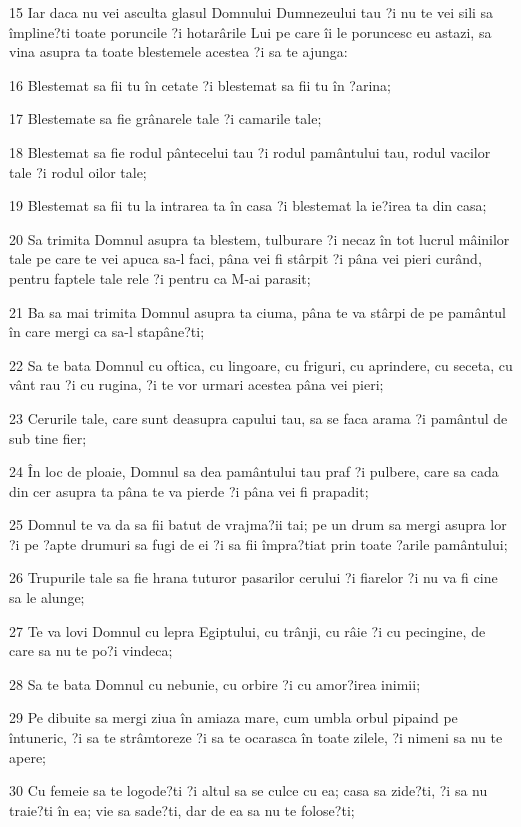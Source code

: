 \par 15 Iar daca nu vei asculta glasul Domnului Dumnezeului tau ?i nu te vei sili sa împline?ti toate poruncile ?i hotarârile Lui pe care îi le poruncesc eu astazi, sa vina asupra ta toate blestemele acestea ?i sa te ajunga:
\par 16 Blestemat sa fii tu în cetate ?i blestemat sa fii tu în ?arina;
\par 17 Blestemate sa fie grânarele tale ?i camarile tale;
\par 18 Blestemat sa fie rodul pântecelui tau ?i rodul pamântului tau, rodul vacilor tale ?i rodul oilor tale;
\par 19 Blestemat sa fii tu la intrarea ta în casa ?i blestemat la ie?irea ta din casa;
\par 20 Sa trimita Domnul asupra ta blestem, tulburare ?i necaz în tot lucrul mâinilor tale pe care te vei apuca sa-l faci, pâna vei fi stârpit ?i pâna vei pieri curând, pentru faptele tale rele ?i pentru ca M-ai parasit;
\par 21 Ba sa mai trimita Domnul asupra ta ciuma, pâna te va stârpi de pe pamântul în care mergi ca sa-l stapâne?ti;
\par 22 Sa te bata Domnul cu oftica, cu lingoare, cu friguri, cu aprindere, cu seceta, cu vânt rau ?i cu rugina, ?i te vor urmari acestea pâna vei pieri;
\par 23 Cerurile tale, care sunt deasupra capului tau, sa se faca arama ?i pamântul de sub tine fier;
\par 24 În loc de ploaie, Domnul sa dea pamântului tau praf ?i pulbere, care sa cada din cer asupra ta pâna te va pierde ?i pâna vei fi prapadit;
\par 25 Domnul te va da sa fii batut de vrajma?ii tai; pe un drum sa mergi asupra lor ?i pe ?apte drumuri sa fugi de ei ?i sa fii împra?tiat prin toate ?arile pamântului;
\par 26 Trupurile tale sa fie hrana tuturor pasarilor cerului ?i fiarelor ?i nu va fi cine sa le alunge;
\par 27 Te va lovi Domnul cu lepra Egiptului, cu trânji, cu râie ?i cu pecingine, de care sa nu te po?i vindeca;
\par 28 Sa te bata Domnul cu nebunie, cu orbire ?i cu amor?irea inimii;
\par 29 Pe dibuite sa mergi ziua în amiaza mare, cum umbla orbul pipaind pe întuneric, ?i sa te strâmtoreze ?i sa te ocarasca în toate zilele, ?i nimeni sa nu te apere;
\par 30 Cu femeie sa te logode?ti ?i altul sa se culce cu ea; casa sa zide?ti, ?i sa nu traie?ti în ea; vie sa sade?ti, dar de ea sa nu te folose?ti;
